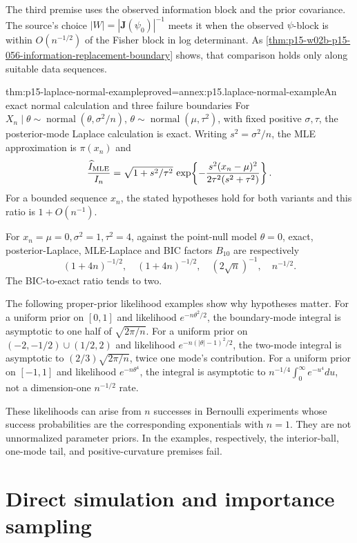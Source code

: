 The third premise uses the observed information block and the prior
covariance. The source's choice \(|W|=|\mathbf J(\psi_0)|^{-1}\) meets it
when the observed \(\psi\)-block is within \(O(n^{-1/2})\) of the Fisher
block in log determinant. As
\cref{thm:p15-w02b-p15-056-information-replacement-boundary} shows, that
comparison holds only along suitable data sequences.

\begin{hbtheorem}{thm:p15-laplace-normal-example}{proved=annex:p15.laplace-normal-example}{An exact normal calculation and three failure boundaries}
For \(X_n\mid\theta\sim\operatorname{normal}(\theta,\sigma^2/n)\),
\(\theta\sim\operatorname{normal}(\mu,\tau^2)\), with fixed positive
\(\sigma,\tau\), the posterior-mode Laplace calculation is exact.
Writing \(s^2=\sigma^2/n\), the MLE approximation is \(\pi(x_n)\) and
\[
 \frac{\widehat I_{\rm MLE}}{I_n}
 =\sqrt{1+s^2/\tau^2}\,
   \exp\!\left\{-\frac{s^2(x_n-\mu)^2}{2\tau^2(s^2+\tau^2)}\right\}.
\]
For a bounded sequence \(x_n\), the stated hypotheses hold for both
variants and this ratio is \(1+O(n^{-1})\).

For \(x_n=\mu=0,\sigma^2=1,\tau^2=4\), against the point-null model
\(\theta=0\), exact, posterior-Laplace, MLE-Laplace and BIC factors
\(B_{10}\) are respectively
\[
 (1+4n)^{-1/2},\quad(1+4n)^{-1/2},\quad(2\sqrt n)^{-1},\quad n^{-1/2}.
\]
The BIC-to-exact ratio tends to two.

The following proper-prior likelihood examples show why hypotheses matter.
For a uniform prior on \([0,1]\) and likelihood \(e^{-n\theta^2/2}\),
the boundary-mode integral is asymptotic to one half of
\(\sqrt{2\pi/n}\). For a uniform prior on
\((-2,-1/2)\cup(1/2,2)\) and likelihood
\(e^{-n(|\theta|-1)^2/2}\), the two-mode integral is asymptotic to
\((2/3)\sqrt{2\pi/n}\), twice one mode's contribution.
For a uniform prior on \([-1,1]\) and likelihood \(e^{-n\theta^4}\),
the integral is asymptotic to
\(n^{-1/4}\int_0^\infty e^{-u^4}du\), not a dimension-one
\(n^{-1/2}\) rate.
\end{hbtheorem}

These likelihoods can arise from \(n\) successes in Bernoulli experiments
whose success probabilities are the corresponding exponentials with \(n=1\).
They are not unnormalized parameter priors. In the examples, respectively,
the interior-ball, one-mode tail, and positive-curvature premises fail.

\section{Direct simulation and importance sampling}
\label{sec:p15-evidence-monte-carlo}

